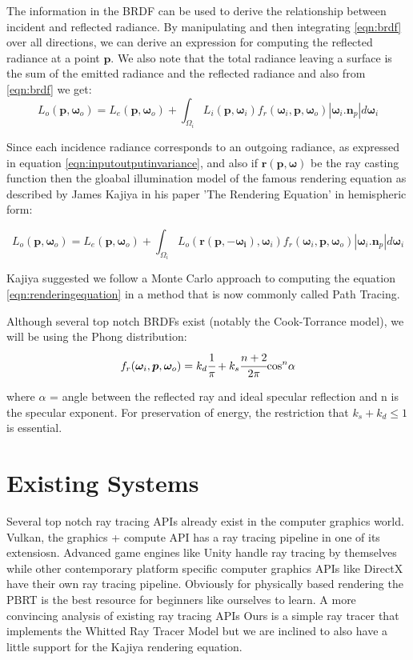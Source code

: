 \documentclass[a4paper, 12pt]{article}
\begin{document}
The information in the BRDF can be used to derive the relationship between incident and reflected 
radiance. By manipulating and then integrating \eqref{eqn:brdf} over all directions, we can derive 
an expression for computing the reflected radiance at a point $\bm{p}$. We also note that 
the total radiance leaving a surface is the sum of the emitted radiance and the reflected radiance and 
also from \eqref{eqn:brdf} we get:
$$
L_{o}(\bm{p}, \bm{\omega}_{o}) = L_{e}(\bm{p}, \bm{\omega}_{o}) + \int_{\Omega_{i}}L_{i}(\bm{p}, \bm{\omega}_{i})
f_{r}(\bm{\omega}_{i}, \bm{p}, \bm{\omega}_{o})|\bm{\omega}_{i}.\bm{n}_{p}|d\bm{\omega}_{i}
$$

Since each incidence radiance corresponds to an outgoing 
radiance, as expressed in equation \eqref{eqn:inputoutputinvariance}, 
and also if $\bm{r}(\bm{p}, \bm{\omega})$ be the ray casting function then the 
gloabal illumination model of the famous rendering equation as 
described by James Kajiya in his paper 'The Rendering Equation'\cite{kajiya}
in hemispheric form: 

\begin{equation}\label{eqn:renderingequation}
L_{o}(\bm{p}, \bm{\omega}_{o}) = L_{e}(\bm{p}, \bm{\omega}_{o}) + \int_{\Omega_{i}}L_{o}(\bm{r}(\bm{p}, -\bm{\omega_{i}}), \bm{\omega}_{i})
f_{r}(\bm{\omega}_{i}, \bm{p}, \bm{\omega}_{o})|\bm{\omega}_{i}.\bm{n}_{p}|d\bm{\omega}_{i}
\end{equation}

Kajiya suggested we follow a Monte Carlo approach 
to computing the equation \eqref{eqn:renderingequation} 
in a method that is now commonly called Path Tracing.

Although several top notch BRDFs exist (notably 
the Cook-Torrance model\cite{cooktorrance}), 
we will be using the Phong distribution: 
$$
f_{r}(\bm{\omega}_{i}, \bm{p}, \bm{\omega}_{o}) = k_{d}\cfrac{1}{\pi}+k_{s}\cfrac{n+2}{2\pi}\text{cos}^{n}\alpha
$$

where $\alpha$ = angle between the reflected ray and ideal specular reflection and 
n is the specular exponent. For preservation of energy, the restriction that $k_{s}+k_{d}\leq 1$
is essential.

\section{Existing Systems}
Several top notch ray tracing APIs already exist 
in the computer graphics world. Vulkan, the graphics 
+ compute API has a ray tracing pipeline in one of 
its extensiosn. Advanced game engines 
like Unity handle ray tracing by themselves 
while other contemporary platform specific
computer graphics APIs like DirectX have their own 
ray tracing pipeline. Obviously for 
physically based rendering the PBRT\cite{pbrt} is 
the best resource for beginners like ourselves to learn.
A more convincing analysis 
of existing ray tracing APIs 
Ours is a simple ray tracer that implements the 
Whitted Ray Tracer Model but we are inclined to 
also have a little support for the Kajiya rendering equation.
\end{document}
